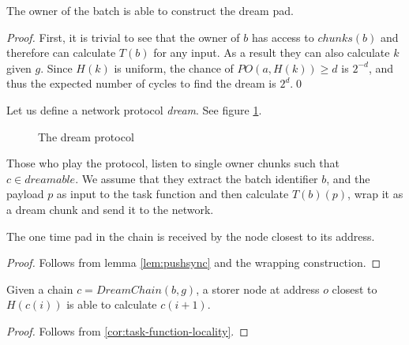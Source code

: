 \begin{lemma}

The owner of the batch is able to construct the dream pad.

\begin{proof}
First, it is trivial to see that the owner of  $b$ has access to $\mathit{chunks(b)}$ and  therefore can  calculate $T(b)$ for any input. As a result they can also calculate $k$ given $g$. Since $\mathit{H}(k)$ is uniform, the chance of $\mathit{PO}(a,\mathit{H}(k))\geq d$ is $2^{-d}$, and thus the expected number of cycles to find the dream is $2^d$.\qed
\end{proof}
\end{lemma}


Let us  define a network protocol \emph{dream}. See figure \ref{fig:protocol}. 

\begin{figure}[htbp]
  \centering
  \caption{The dream protocol}
\label{fig:protocol}
\end{figure}


\begin{definition}

Those who play the protocol, listen to single owner chunks such that $c\in\mathit{dreamable}$.
We assume that they extract the batch identifier $b$, and the payload $p$ as input to the task function and then calculate $T(b)(p)$, wrap it as a dream chunk and send it to the network.
\end{definition}

\begin{corollary}
\label{cor:reception}
The one time pad in the chain is received by the node closest to its address.

\begin{proof}
Follows from lemma \ref{lem:pushsync} and the wrapping construction. \qedsymbol
\end{proof}
\end{corollary}



\begin{corollary}
\label{cor:continuity}
Given a chain  $c=\mathit{DreamChain}(b,g)$, 
a storer node at address $o$ closest to $\mathit{H}(c(i))$ is able to calculate $c(i+1)$.

\begin{proof}
Follows from \ref{cor:task-function-locality}.
\qedsymbol
\end{proof}
\end{corollary}

